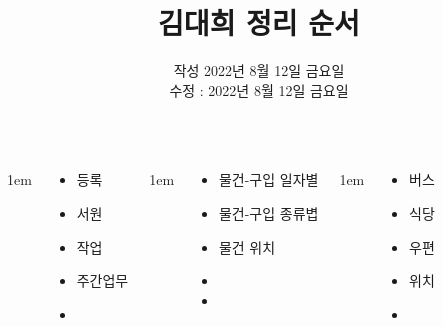 \documentclass[	20pt, 
							a0paper, 
							landscape,
							margin=0mm, %
							innermargin=10mm,  		%
							blockverticalspace=4mm, %
							colspace=5mm, 
							subcolspace=0mm
							]{tikzposter}
\title{ 김대희 정리 순서 }
\author{ 	작성 2022년 8월 12일 금요일 \\
				수정 : 2022년 8월 12일 금요일 }
\begin{document}
	\maketitle[
					width=841mm,
					linewidth = 2mm,
					innersep=4mm,
					titletotopverticalspace=2mm, %
					titletoblockverticalspace=2mm, %
					titletextscale =4, 
				]


	\begin{columns}


			{
					\setlength{\leftmargini}{4em}
					\setlength{\labelsep} {1em}
				\begin{LARGE}
					\begin{itemize}
					\item 등록 
					\item 서원
					\item 작업
					\item 주간업무
					\item 
					\end{itemize}
				\end{LARGE}
			} %


			{
					\setlength{\leftmargini}{4em}
					\setlength{\labelsep} {1em}
				\begin{LARGE}
					\begin{itemize}
					\item 물건-구입 일자별 
					\item 물건-구입 종류볍
					\item 물건 위치
					\item
					\item
					\end{itemize}
				\end{LARGE}
			} %


			{
					\setlength{\leftmargini}{4em}
					\setlength{\labelsep} {1em}
				\begin{LARGE}
					\begin{itemize}
					\item 버스
					\item 식당
					\item 우편
					\item 위치
					\item
					\end{itemize}
				\end{LARGE}
			} %



\end{columns}
\end{document}
